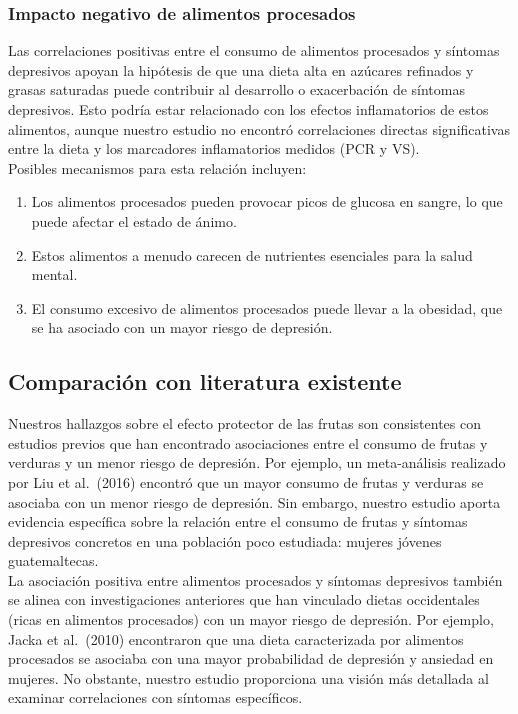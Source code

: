 \documentclass[jou]{apa7}
\begin{document}
	\subsubsection{Impacto negativo de alimentos		procesados}\label{impacto-negativo-de-alimentos-procesados}
	
	Las correlaciones positivas entre el consumo de alimentos procesados y
	síntomas depresivos apoyan la hipótesis de que una dieta alta en
	azúcares refinados y grasas saturadas puede contribuir al desarrollo o
	exacerbación de síntomas depresivos. Esto podría estar relacionado con
	los efectos inflamatorios de estos alimentos, aunque nuestro estudio no
	encontró correlaciones directas significativas entre la dieta y los
	marcadores inflamatorios medidos (PCR y VS).\\
	
	Posibles mecanismos para esta relación incluyen:
	
	\begin{enumerate}
		\item Los alimentos procesados pueden provocar picos de glucosa en sangre, lo que puede afectar el estado de ánimo.
		\item Estos alimentos a menudo carecen de nutrientes esenciales para la salud mental.
		\item El consumo excesivo de alimentos procesados puede llevar a la obesidad, que se ha asociado con un mayor riesgo de depresión.
	\end{enumerate}
	
	
	\subsection{Comparación con literatura existente}\label{comparaciuxf3n-con-literatura-existente}
	
	Nuestros hallazgos sobre el efecto protector de las frutas son
	consistentes con estudios previos que han encontrado asociaciones entre
	el consumo de frutas y verduras y un menor riesgo de depresión. Por
	ejemplo, un meta-análisis realizado por Liu et al.~(2016) encontró que
	un mayor consumo de frutas y verduras se asociaba con un menor riesgo de
	depresión. Sin embargo, nuestro estudio aporta evidencia específica
	sobre la relación entre el consumo de frutas y síntomas depresivos
	concretos en una población poco estudiada: mujeres jóvenes
	guatemaltecas.\\
	
	La asociación positiva entre alimentos procesados y síntomas depresivos
	también se alinea con investigaciones anteriores que han vinculado
	dietas occidentales (ricas en alimentos procesados) con un mayor riesgo
	de depresión. Por ejemplo, Jacka et al.~(2010) encontraron que una dieta
	caracterizada por alimentos procesados se asociaba con una mayor
	probabilidad de depresión y ansiedad en mujeres. No obstante, nuestro
	estudio proporciona una visión más detallada al examinar correlaciones
	con síntomas específicos.
	
\end{document}
